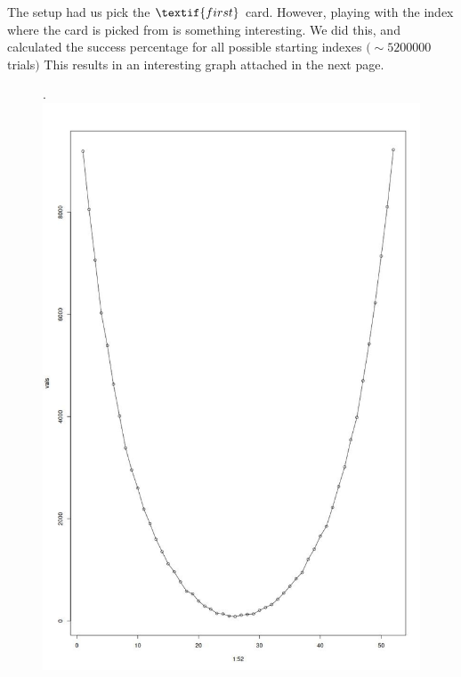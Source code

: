 \documentclass[a4paper]{article}
\begin{document}
The setup had us pick the $\textif{first}$ card. However, playing with the index where the card is picked from is something interesting. 
We did this, and calculated the success percentage for all possible starting indexes $(\sim 5200000$ trials$)$
This results in an interesting graph attached in the next page.  
\begin{figure}. 
    \centering
    \includegraphics[width=\linewidth ]{graph.jpeg}
\end{figure}
\end{document}
